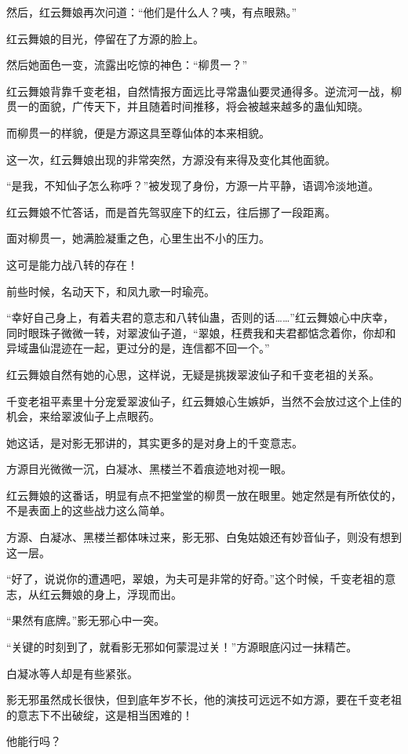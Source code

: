 \begin{this_body}
然后，红云舞娘再次问道：“他们是什么人？咦，有点眼熟。”

红云舞娘的目光，停留在了方源的脸上。

然后她面色一变，流露出吃惊的神色：“柳贯一？”

红云舞娘背靠千变老祖，自然情报方面远比寻常蛊仙要灵通得多。逆流河一战，柳贯一的面貌，广传天下，并且随着时间推移，将会被越来越多的蛊仙知晓。

而柳贯一的样貌，便是方源这具至尊仙体的本来相貌。

这一次，红云舞娘出现的非常突然，方源没有来得及变化其他面貌。

“是我，不知仙子怎么称呼？”被发现了身份，方源一片平静，语调冷淡地道。

红云舞娘不忙答话，而是首先驾驭座下的红云，往后挪了一段距离。

面对柳贯一，她满脸凝重之色，心里生出不小的压力。

这可是能力战八转的存在！

前些时候，名动天下，和凤九歌一时瑜亮。

“幸好自己身上，有着夫君的意志和八转仙蛊，否则的话……”红云舞娘心中庆幸，同时眼珠子微微一转，对翠波仙子道，“翠娘，枉费我和夫君都惦念着你，你却和异域蛊仙混迹在一起，更过分的是，连信都不回一个。”

红云舞娘自然有她的心思，这样说，无疑是挑拨翠波仙子和千变老祖的关系。

千变老祖平素里十分宠爱翠波仙子，红云舞娘心生嫉妒，当然不会放过这个上佳的机会，来给翠波仙子上点眼药。

她这话，是对影无邪讲的，其实更多的是对身上的千变意志。

方源目光微微一沉，白凝冰、黑楼兰不着痕迹地对视一眼。

红云舞娘的这番话，明显有点不把堂堂的柳贯一放在眼里。她定然是有所依仗的，不是表面上的这些战力这么简单。

方源、白凝冰、黑楼兰都体味过来，影无邪、白兔姑娘还有妙音仙子，则没有想到这一层。

“好了，说说你的遭遇吧，翠娘，为夫可是非常的好奇。”这个时候，千变老祖的意志，从红云舞娘的身上，浮现而出。

“果然有底牌。”影无邪心中一突。

“关键的时刻到了，就看影无邪如何蒙混过关！”方源眼底闪过一抹精芒。

白凝冰等人却是有些紧张。

影无邪虽然成长很快，但到底年岁不长，他的演技可远远不如方源，要在千变老祖的意志下不出破绽，这是相当困难的！

他能行吗？

\end{this_body}


